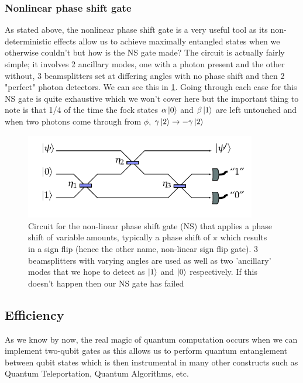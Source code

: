 \subsubsection{Nonlinear phase shift gate}
As stated above, the nonlinear phase shift gate is a very useful tool as its non-deterministic effects allow us to achieve maximally entangled states when we otherwise couldn't but how is the NS gate made? The circuit is actually fairly simple; it involves 2 ancillary modes, one with a photon present and the other without, 3 beamsplitters set at differing angles with no phase shift and then 2 "perfect" photon detectors. We can see this in \cref{fig:NS_gate}. Going through each case for this NS gate is quite exhaustive which we won't cover here but the important thing to note is that 1/4 of the time the fock states $\alpha\ket{0}$ and $\beta\ket{1}$ are left untouched and when two photons come through from $\phi$, $\gamma\ket{2} \rightarrow -\gamma\ket{2}$ 

\begin{figure}[H]
    \centering
    \includegraphics[width=0.9\textwidth]{images/NS gate.png}
    \caption{Circuit for the non-linear phase shift gate (NS) that applies a phase shift of variable amounts, typically a phase shift of $\pi$ which results in a sign flip (hence the other name, non-linear sign flip gate). 3 beamsplitters with varying angles are used as well as two 'ancillary' modes that we hope to detect as $\ket{1}$ and $\ket{0}$ respectively. If this doesn't happen then our NS gate has failed}\label{fig:NS_gate}
\end{figure}



\subsection{Efficiency}
As we know by now, the real magic of quantum computation occurs when we can implement two-qubit gates as this allows us to perform quantum entanglement between qubit states which is then instrumental in many other constructs such as Quantum Teleportation, Quantum Algorithms, etc.

